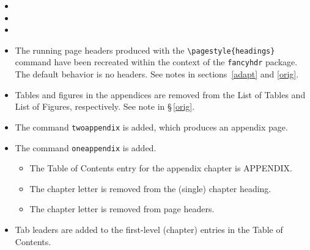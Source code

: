 \begin{spacing}{1.55}
\begin{itemize}
	\item {}
	\item {}
	\item {}
	\item  The running page headers produced with the \verb|\pagestyle{headings}| command have been recreated within the context of the \texttt{fancyhdr} package.  The default behavior is no headers.  See notes in sections~\ref{adapt} and \ref{orig}.
	\item Tables and figures in the appendices are removed from the List of Tables and List of Figures, respectively.  See note in \S\,\ref{orig}.
	\item The command \verb|twoappendix| is added, which produces an appendix page.
	\item The command \verb|oneappendix| is added.
			\vspace{-4pt}
			\begin{itemize}
			\setlength{\itemsep}{-2pt}
			\item The Table of Contents entry for the appendix chapter is APPENDIX.
			\item The chapter letter is removed from the (single) chapter heading.
			\item The chapter letter is removed from page headers.
		\end{itemize}
	\item Tab leaders are added to the first-level (chapter) entries in the Table of Contents.
		
\end{itemize}


\end{spacing}
